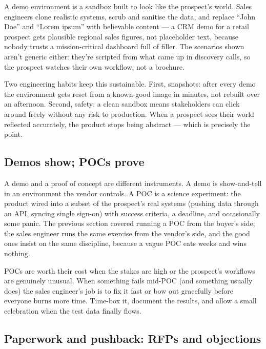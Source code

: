 A demo environment is a sandbox built to look like the prospect's world. Sales engineers clone realistic systems, scrub and sanitise the data, and replace ``John Doe'' and ``Lorem ipsum'' with believable content — a CRM demo for a retail prospect gets plausible regional sales figures, not placeholder text, because nobody trusts a mission-critical dashboard full of filler. The scenarios shown aren't generic either: they're scripted from what came up in discovery calls, so the prospect watches their own workflow, not a brochure.


Two engineering habits keep this sustainable. First, snapshots: after every demo the environment gets reset from a known-good image in minutes, not rebuilt over an afternoon. Second, safety: a clean sandbox means stakeholders can click around freely without any risk to production. When a prospect sees their world reflected accurately, the product stops being abstract — which is precisely the point.



\subsection{Demos show; POCs prove}


A demo and a proof of concept are different instruments. A demo is show-and-tell in an environment the vendor controls. A POC is a science experiment: the product wired into a subset of the prospect's real systems (pushing data through an API, syncing single sign-on) with success criteria, a deadline, and occasionally some panic. The previous section covered running a POC from the buyer's side; the sales engineer runs the same exercise from the vendor's side, and the good ones insist on the same discipline, because a vague POC eats weeks and wins nothing.


POCs are worth their cost when the stakes are high or the prospect's workflows are genuinely unusual. When something fails mid-POC (and something usually does) the sales engineer's job is to fix it fast or bow out gracefully before everyone burns more time. Time-box it, document the results, and allow a small celebration when the test data finally flows.



\subsection{Paperwork and pushback: RFPs and objections}


